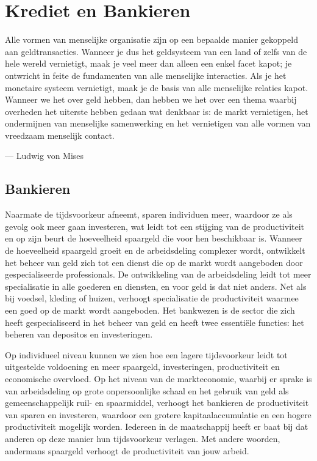 \hypertarget{krediet-en-bankieren}{%
\chapter{Krediet en Bankieren}\label{krediet-en-bankieren}}

\begin{blockquotebox}
    Alle vormen van menselijke organisatie zijn op een bepaalde manier gekoppeld aan geldtransacties. Wanneer je dus het geldsysteem van een land of zelfs van de hele wereld vernietigt, maak je veel meer dan alleen een enkel facet kapot; je ontwricht in feite de fundamenten van alle menselijke interacties. Als je het monetaire systeem vernietigt, maak je de basis van alle menselijke relaties kapot. Wanneer we het over geld hebben, dan hebben we het over een thema waarbij overheden het uiterste hebben gedaan wat denkbaar is: de markt vernietigen, het ondermijnen van menselijke samenwerking en het vernietigen van alle vormen van vreedzaam menselijk contact.
    \par\raggedleft--- Ludwig von Mises
\end{blockquotebox}
\autocite{155}

\hypertarget{bankieren}{%
\section{Bankieren}\label{bankieren}}

Naarmate de tijdsvoorkeur afneemt, sparen individuen meer, waardoor ze als gevolg ook meer gaan investeren, wat leidt tot een stijging van de productiviteit en op zijn beurt de hoeveelheid spaargeld die voor hen beschikbaar is. Wanneer de hoeveelheid spaargeld groeit en de arbeidsdeling complexer wordt, ontwikkelt het beheer van geld zich tot een dienst die op de markt wordt aangeboden door gespecialiseerde professionals. De ontwikkeling van de arbeidsdeling leidt tot meer specialisatie in alle goederen en diensten, en voor geld is dat niet anders. Net als bij voedsel, kleding of huizen, verhoogt specialisatie de productiviteit waarmee een goed op de markt wordt aangeboden. Het bankwezen is de sector die zich heeft gespecialiseerd in het beheer van geld en heeft twee essentiële functies: het beheren van deposito\textquotesingle s en investeringen.

Op individueel niveau kunnen we zien hoe een lagere tijdsvoorkeur leidt tot uitgestelde voldoening en meer spaargeld, investeringen, productiviteit en economische overvloed. Op het niveau van de markteconomie, waarbij er sprake is van arbeidsdeling op grote onpersoonlijke schaal en het gebruik van geld als gemeenschappelijk ruil- en spaarmiddel, verhoogt het bankieren de productiviteit van sparen en investeren, waardoor een grotere kapitaalaccumulatie en een hogere productiviteit mogelijk worden. Iedereen in de maatschappij heeft er baat bij dat anderen op deze manier hun tijdsvoorkeur verlagen. Met andere woorden, andermans spaargeld verhoogt de productiviteit van jouw arbeid.

